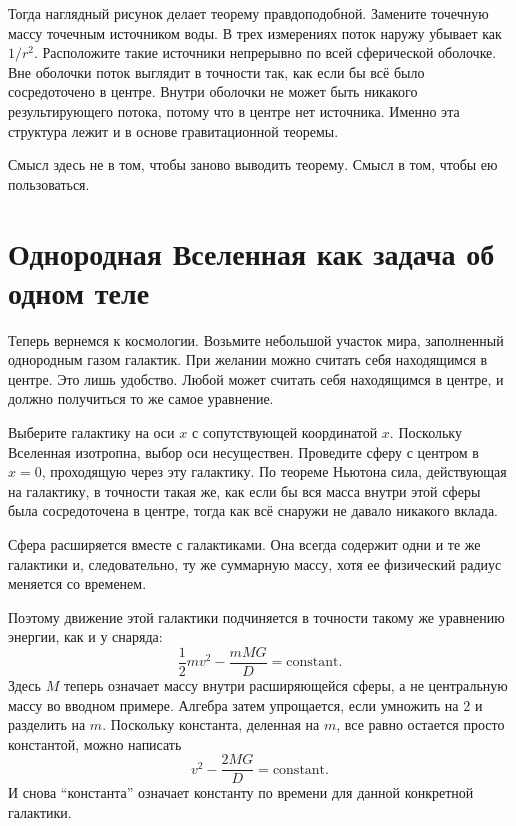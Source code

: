 Тогда наглядный рисунок делает теорему правдоподобной. Замените точечную массу точечным источником воды. В трех измерениях поток наружу убывает как \(1/r^2\). Расположите такие источники непрерывно по всей сферической оболочке. Вне оболочки поток выглядит в точности так, как если бы всё было сосредоточено в центре. Внутри оболочки не может быть никакого результирующего потока, потому что в центре нет источника. Именно эта структура лежит и в основе гравитационной теоремы.

Смысл здесь не в том, чтобы заново выводить теорему. Смысл в том, чтобы ею пользоваться.

\section{Однородная Вселенная как задача об одном теле}

Теперь вернемся к космологии. Возьмите небольшой участок мира, заполненный однородным газом галактик. При желании можно считать себя находящимся в центре. Это лишь удобство. Любой может считать себя находящимся в центре, и должно получиться то же самое уравнение.

Выберите галактику на оси \(x\) с сопутствующей координатой \(x\). Поскольку Вселенная изотропна, выбор оси несуществен. Проведите сферу с центром в \(x=0\), проходящую через эту галактику. По теореме Ньютона сила, действующая на галактику, в точности такая же, как если бы вся масса внутри этой сферы была сосредоточена в центре, тогда как всё снаружи не давало никакого вклада.

Сфера расширяется вместе с галактиками. Она всегда содержит одни и те же галактики и, следовательно, ту же суммарную массу, хотя ее физический радиус меняется со временем.

Поэтому движение этой галактики подчиняется в точности такому же уравнению энергии, как и у снаряда:
\begin{equation}
\frac{1}{2}mv^2-\frac{mMG}{D}=\text{constant}.
\end{equation}
Здесь \(M\) теперь означает массу внутри расширяющейся сферы, а не центральную массу во вводном примере. Алгебра затем упрощается, если умножить на \(2\) и разделить на \(m\). Поскольку константа, деленная на \(m\), все равно остается просто константой, можно написать
\begin{equation}
v^2-\frac{2MG}{D}=\text{constant}.
\end{equation}
И снова ``константа'' означает константу по времени для данной конкретной галактики.

